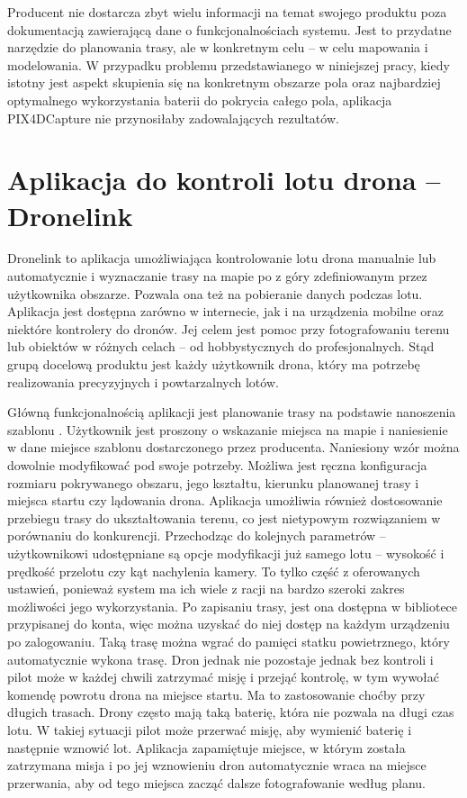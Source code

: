 Producent nie dostarcza zbyt wielu informacji na temat swojego produktu poza dokumentacją zawierającą dane o funkcjonalnościach systemu. Jest to przydatne narzędzie do planowania trasy, ale w konkretnym celu – w celu mapowania i modelowania. W przypadku problemu przedstawianego w niniejszej pracy, kiedy istotny jest aspekt skupienia się na konkretnym obszarze pola oraz najbardziej optymalnego wykorzystania baterii do pokrycia całego pola, aplikacja PIX4DCapture nie przynosiłaby zadowalających rezultatów.

\section{Aplikacja do kontroli lotu drona – Dronelink}

Dronelink to aplikacja umożliwiająca kontrolowanie lotu drona manualnie lub automatycznie i wyznaczanie trasy na mapie po z góry zdefiniowanym przez użytkownika obszarze. Pozwala ona też na pobieranie danych podczas lotu. Aplikacja jest dostępna zarówno w internecie, jak i na urządzenia mobilne oraz niektóre kontrolery do dronów. Jej celem jest pomoc przy fotografowaniu terenu lub obiektów w różnych celach – od hobbystycznych do profesjonalnych. Stąd grupą docelową produktu jest każdy użytkownik drona, który ma potrzebę realizowania precyzyjnych i powtarzalnych lotów.

Główną funkcjonalnością aplikacji jest planowanie trasy na podstawie nanoszenia szablonu \cite{dronelink}. Użytkownik jest proszony o wskazanie miejsca na mapie i naniesienie w dane miejsce szablonu dostarczonego przez producenta. Naniesiony wzór można dowolnie modyfikować pod swoje potrzeby. Możliwa jest ręczna konfiguracja rozmiaru pokrywanego obszaru, jego kształtu, kierunku planowanej trasy i miejsca startu czy lądowania drona. Aplikacja umożliwia również dostosowanie przebiegu trasy do ukształtowania terenu, co jest nietypowym rozwiązaniem w porównaniu do konkurencji. Przechodząc do kolejnych parametrów – użytkownikowi udostępniane są opcje modyfikacji już samego lotu – wysokość i prędkość przelotu czy kąt nachylenia kamery. To tylko część z oferowanych ustawień, ponieważ system ma ich wiele z racji na bardzo szeroki zakres możliwości jego wykorzystania. Po zapisaniu trasy, jest ona dostępna w bibliotece przypisanej do konta, więc można uzyskać do niej dostęp na każdym urządzeniu po zalogowaniu. Taką trasę można wgrać do pamięci statku powietrznego, który automatycznie wykona trasę. Dron jednak nie pozostaje jednak bez kontroli i pilot może w każdej chwili zatrzymać misję i przejąć kontrolę, w tym wywołać komendę powrotu drona na miejsce startu. Ma to zastosowanie choćby przy długich trasach. Drony często mają taką baterię, która nie pozwala na długi czas lotu. W takiej sytuacji pilot może przerwać misję, aby wymienić baterię i następnie wznowić lot. Aplikacja zapamiętuje miejsce, w którym została zatrzymana misja i po jej wznowieniu dron automatycznie wraca na miejsce przerwania, aby od tego miejsca zacząć dalsze fotografowanie według planu.

